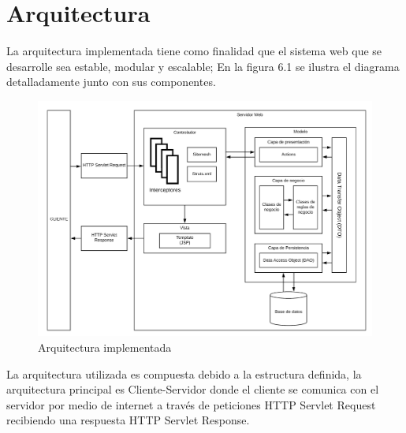 \chapter{Arquitectura} \label{cap:seis}

La arquitectura implementada tiene como finalidad que el sistema web que se desarrolle sea estable, modular y escalable; En la figura 6.1 se ilustra el diagrama detalladamente junto con sus componentes.

\begin{figure}[H]
	\begin{center}
		\includegraphics[width=.75\textwidth]{images/arquitectura/DiagramaArquitecturaTesseract}
		\caption{Arquitectura implementada}
		\label{fig:arqui}
	\end{center}
\end{figure}

La arquitectura utilizada es compuesta debido a la estructura definida, la arquitectura principal es Cliente-Servidor donde el cliente se comunica con el servidor por medio de internet a través de peticiones HTTP Servlet Request recibiendo una respuesta HTTP Servlet Response.\\

